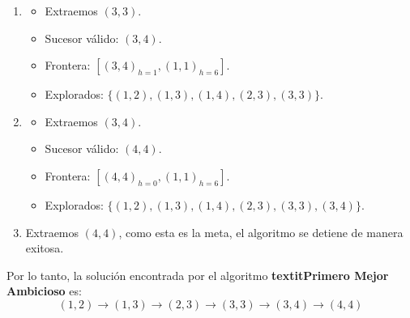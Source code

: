 \begin{enumerate}[label=Paso \arabic*:]
\item

  \begin{itemize}
  \item Extraemos $(3,3)$.
  \item Sucesor válido: $(3,4)$.
  \item Frontera: $[(3,4)_{h=1}, (1,1)_{h=6}]$.
  \item   Explorados: $\{(1,2), (1,3), (1,4), (2,3), (3,3)\}$.
  \end{itemize}
    
\item

  \begin{itemize}
  \item Extraemos $(3,4)$.
  \item Sucesor válido: $(4,4)$.
  \item Frontera: $[(4,4)_{h=0}, (1,1)_{h=6}]$.
  \item Explorados: $\{(1,2), (1,3), (1,4), (2,3), (3,3), (3,4)\}$.
  \end{itemize}
  
\item Extraemos $(4,4)$, como esta es la meta, el algoritmo se detiene de manera exitosa.
\end{enumerate}

\bigskip

Por lo tanto, la solución encontrada por el algoritmo \textbf{textit{Primero Mejor Ambicioso}} es:
\[
(1,2) \rightarrow (1,3) \rightarrow (2,3) \rightarrow (3,3) \rightarrow (3,4) \rightarrow (4,4)
\]
